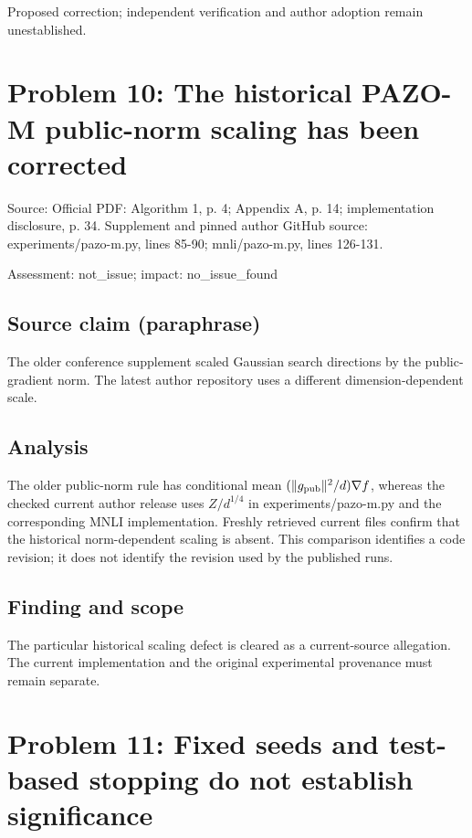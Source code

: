 \documentclass[11pt]{article}
\begin{document}
Proposed correction; independent verification and author adoption remain unestablished.

\section*{Problem 10: The historical PAZO-M public-norm scaling has been corrected}

Source: Official PDF: Algorithm 1, p. 4; Appendix A, p. 14; implementation disclosure, p. 34. Supplement and pinned author GitHub source: experiments/pazo-m.py, lines 85-90; mnli/pazo-m.py, lines 126-131.

Assessment: not\_issue; impact: no\_issue\_found

\subsection*{Source claim (paraphrase)}

The older conference supplement scaled Gaussian search directions by the public-gradient norm. The latest author repository uses a different dimension-dependent scale.

\subsection*{Analysis}

The older public-norm rule has conditional mean \((\|g_{\rm pub}\|^2/d)\nabla f\), whereas the checked current author release uses \(Z/d^{1/4}\) in experiments/pazo-m.py and the corresponding MNLI implementation. Freshly retrieved current files confirm that the historical norm-dependent scaling is absent. This comparison identifies a code revision; it does not identify the revision used by the published runs.

\subsection*{Finding and scope}

The particular historical scaling defect is cleared as a current-source allegation. The current implementation and the original experimental provenance must remain separate.

\section*{Problem 11: Fixed seeds and test-based stopping do not establish significance}
\end{document}
